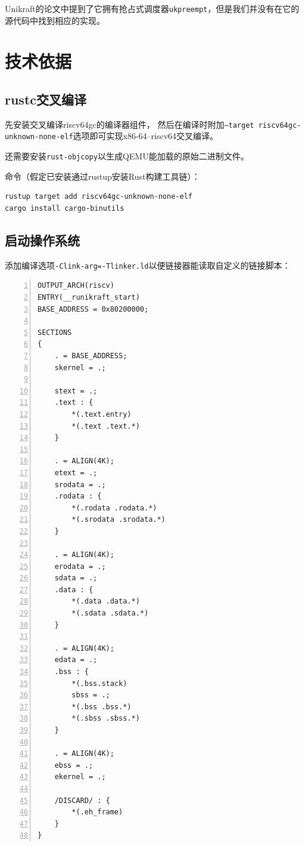 \documentclass{../runikraft-report}
\begin{document}
Unikraft的论文中提到了它拥有抢占式调度器\texttt{ukpreempt}，但是我们并没有在它的源代码中找到相应的实现。

\section{技术依据}\vspace*{-4ex}
\subsection{rustc交叉编译}
先安装交叉编译riscv64gc的编译器组件，
然后在编译时附加\texttt{--target riscv64gc-\linebreak unknown-none-elf}选项即可实现x86-64--riscv64交叉编译。

还需要安装\texttt{rust-objcopy}以生成QEMU能加载的原始二进制文件。

\noindent 命令（假定已安装通过rustup安装Rust构建工具链）：
\begin{lstlisting}
rustup target add riscv64gc-unknown-none-elf
cargo install cargo-binutils
\end{lstlisting}

\subsection{启动操作系统}
添加编译选项\texttt{-Clink-arg=-Tlinker.ld}以便链接器能读取自定义的链接脚本：
\begin{multicols}{2}
\begin{lstlisting}[numbers=left]
OUTPUT_ARCH(riscv)
ENTRY(__runikraft_start)
BASE_ADDRESS = 0x80200000;

SECTIONS
{
    . = BASE_ADDRESS;
    skernel = .;

    stext = .;
    .text : {
        *(.text.entry)
        *(.text .text.*)
    }

    . = ALIGN(4K);
    etext = .;
    srodata = .;
    .rodata : {
        *(.rodata .rodata.*)
        *(.srodata .srodata.*)
    }

    . = ALIGN(4K);
    erodata = .;
    sdata = .;
    .data : {
        *(.data .data.*)
        *(.sdata .sdata.*)
    }

    . = ALIGN(4K);
    edata = .;
    .bss : {
        *(.bss.stack)
        sbss = .;
        *(.bss .bss.*)
        *(.sbss .sbss.*)
    }

    . = ALIGN(4K);
    ebss = .;
    ekernel = .;

    /DISCARD/ : {
        *(.eh_frame)
    }
}
\end{lstlisting}
\end{multicols}
\end{document}
